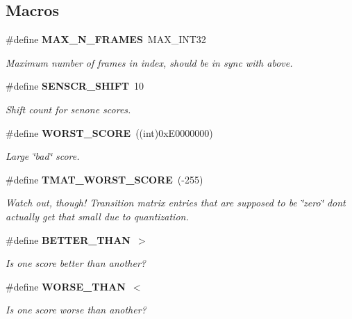 \subsection*{Macros}
\begin{DoxyCompactItemize}
\item 
\mbox{\label{hmm_8h_a5b6b9157cfaaec312508eaed602f0698}} 
\#define \textbf{ M\+A\+X\+\_\+\+N\+\_\+\+F\+R\+A\+M\+ES}~M\+A\+X\+\_\+\+I\+N\+T32
\begin{DoxyCompactList}\small\item\em Maximum number of frames in index, should be in sync with above. \end{DoxyCompactList}\item 
\#define \textbf{ S\+E\+N\+S\+C\+R\+\_\+\+S\+H\+I\+FT}~10
\begin{DoxyCompactList}\small\item\em Shift count for senone scores. \end{DoxyCompactList}\item 
\#define \textbf{ W\+O\+R\+S\+T\+\_\+\+S\+C\+O\+RE}~((int)0x\+E0000000)
\begin{DoxyCompactList}\small\item\em Large \char`\"{}bad\char`\"{} score. \end{DoxyCompactList}\item 
\mbox{\label{hmm_8h_a9b38399b544dbb93bc9b7d0094e91db7}} 
\#define \textbf{ T\+M\+A\+T\+\_\+\+W\+O\+R\+S\+T\+\_\+\+S\+C\+O\+RE}~(-\/255)
\begin{DoxyCompactList}\small\item\em Watch out, though! Transition matrix entries that are supposed to be \char`\"{}zero\char`\"{} don\textquotesingle{}t actually get that small due to quantization. \end{DoxyCompactList}\item 
\mbox{\label{hmm_8h_a2874ab52613ff781c96f570ec0eb0d98}} 
\#define \textbf{ B\+E\+T\+T\+E\+R\+\_\+\+T\+H\+AN}~$>$
\begin{DoxyCompactList}\small\item\em Is one score better than another? \end{DoxyCompactList}\item 
\mbox{\label{hmm_8h_aa930fb8fb6fce7f34bcf4018b81d7066}} 
\#define \textbf{ W\+O\+R\+S\+E\+\_\+\+T\+H\+AN}~$<$
\begin{DoxyCompactList}\small\item\em Is one score worse than another? \end{DoxyCompactList}\item 

\end{DoxyCompactItemize}

